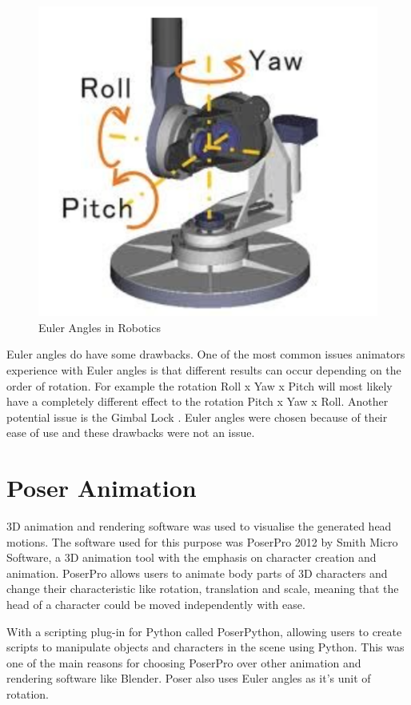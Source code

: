 \documentclass[bsc,frontabs,twoside,singlespacing,parskip]{infthesis}
\begin{document}
\begin{figure}[h!]
	\centering
	\includegraphics[width=.5\textwidth]{euler_angles.png}
	\caption{Euler Angles in Robotics}
\end{figure}

Euler angles do have some drawbacks. One of the most common issues animators experience with Euler angles is that different results can occur depending on the order of rotation. For example the rotation Roll x Yaw x Pitch will most likely have a completely different effect to the rotation Pitch x Yaw x Roll. \cite{quartionions} Another potential issue is the Gimbal Lock \cite{gimbal}. Euler angles were chosen because of their ease of use and these drawbacks were not an issue.

\section{Poser Animation}

3D animation and rendering software was used to visualise the generated head motions. The software used for this purpose was PoserPro 2012 by Smith Micro Software, a 3D animation tool with the emphasis on character creation and animation. PoserPro allows users to animate body parts of 3D characters and change their characteristic like rotation, translation and scale, meaning that the head of a character could be moved independently with ease.

With a scripting plug-in for Python called PoserPython, \cite{poser_python} allowing users to create scripts to manipulate objects and characters in the scene using Python. This was one of the main reasons for choosing PoserPro over other animation and rendering software like Blender. Poser also uses Euler angles as it's unit of rotation.
\end{document}
